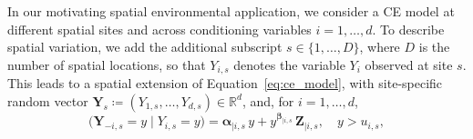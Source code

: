 \documentclass[12pt]{article}
\begin{document}
In our motivating spatial environmental application, we consider a CE model at different spatial sites and across conditioning variables $i = 1, \ldots, d$.
To describe spatial variation, we add the additional subscript $s \in \{1, \ldots, D\}$, where $D$ is the number of spatial locations, so that $Y_{i,s}$ denotes the variable $Y_i$ observed at site $s$.
This leads to a spatial extension of Equation~\eqref{eq:ce_model}, with site-specific random vector $\symbf{Y}_{s} \coloneq \left(Y_{1,s}, \ldots, Y_{d,s}\right) \in \mathbb{R}^d$, and, for $i = 1, \ldots, d$,
\begin{equation} \label{eq:ce_model_spat}
  \bigl(\symbf{Y}_{-i, s} = y \mid Y_{i, s} = y\bigr) 
    = \symbf{\alpha}_{\mid i, s} \, y 
      + y^{\symbf{\beta}_{\mid i, s}} \, \symbf{Z}_{\mid i, s}, 
      \quad y > u_{i, s}, 
\end{equation}
\end{document}
